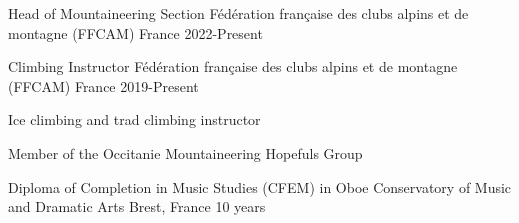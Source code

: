 
\begin{cventries}
  \cventry
  {Head of Mountaineering Section} %
  {Fédération française des clubs alpins et de montagne (FFCAM)} %
  {France} %
  {2022-Present} %
  { }

  \cventry
  {Climbing Instructor} %
  {Fédération française des clubs alpins et de montagne (FFCAM)} %
  {France} %
  {2019-Present} %
  {
    \begin{cvitems} %
    \item {Ice climbing and trad climbing instructor}
    \item {Member of the Occitanie Mountaineering Hopefuls Group}
    \end{cvitems}
  }

  \cventry
  {Diploma of Completion in Music Studies (CFEM) in Oboe} %
  {Conservatory of Music and Dramatic Arts} %
  {Brest, France} %
  {10 years} %
  { }
\end{cventries}
